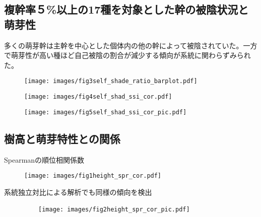 \documentclass[a0, 30pt, plainboxedsections]{sciposter} %
\renewcommand{\baselinestretch}{1.2}
\begin{document}
\begin{multicols}{2}
\begin{mdframed}[style=subsection.frame,frametitle={\huge\textbf{\color{Black1}{\LARGE{\ding{192}}\Large{25種の株構造は種間で大きく異なる}}}}]
\end{mdframed}

\renewcommand{\baselinestretch}{0.8}
\begin{mdframed}[style=subsection.frame,frametitle=
  \huge\textbf{\color{Black1}{\LARGE{\ding{194}}\Large{萌芽性が強い種ほど自己被陰率が下がる}}}]
\renewcommand{\baselinestretch}{1.2}

\subsection*{複幹率５\%以上の17種を対象とした幹の被陰状況と萌芽性}

多くの萌芽幹は主幹を中心とした個体内の他の幹によって被陰されていた。一方で萌芽性が高い種ほど自己被陰の割合が減少する傾向が系統に関わらずみられた。

\begin{figure}
 \begin{minipage}{0.48\hsize}
  \centering
   \texttt{[image: images/fig3self\_shade\_ratio\_barplot.pdf]}
 \end{minipage}
 \begin{minipage}{0.25\hsize}
  \centering
   \texttt{[image: images/fig4self\_shad\_ssi\_cor.pdf]}
 \end{minipage}
 \begin{minipage}{0.25\hsize}
  \centering
   \texttt{[image: images/fig5self\_shad\_ssi\_cor\_pic.pdf]}
 \end{minipage}
\end{figure}

\end{mdframed}

\columnbreak
\renewcommand{\baselinestretch}{0.8}
\begin{mdframed}[style=subsection.frame,frametitle=
  \huge\textbf{\color{Black1}{\LARGE{\ding{193}}\Large{樹高が高くなるほど萌芽性が強くなる}}}]
\renewcommand{\baselinestretch}{1.2} %

\subsection*{樹高と萌芽特性との関係}

Spearmanの順位相関係数

\begin{figure}
	\centering
		\texttt{[image: images/fig1height\_spr\_cor.pdf]}
\end{figure}

系統独立対比による解析でも同様の傾向を検出

\begin{figure}
	\centering
	　　\texttt{[image: images/fig2height\_spr\_cor\_pic.pdf]}
\end{figure}
\end{mdframed}

\end{multicols}

\end{document}
